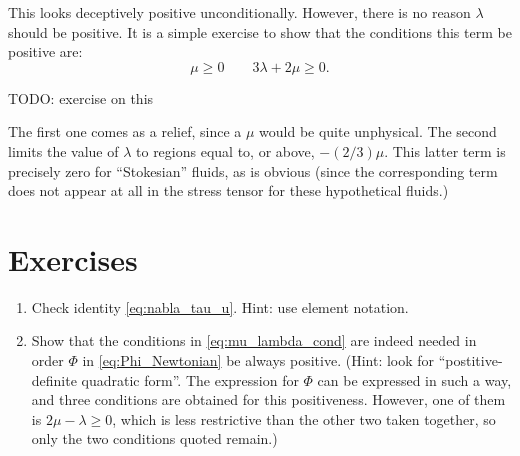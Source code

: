 This looks deceptively positive unconditionally. However, there is no
reason $\lambda$ should be positive. It is a simple exercise to show
that the conditions this term be positive are:
\begin{equation}
  \mu \ge 0 \qquad 3\lambda + 2\mu \ge 0 .\label{eq:mu_lambda_cond}
\end{equation}

TODO: exercise on this

The first one comes as a relief, since a $\mu$ would be quite
unphysical. The second limits the value of $\lambda$ to regions equal
to, or above, $ - (2/3) \mu$. This latter term is precisely zero for
``Stokesian'' fluids, as is obvious (since the corresponding term does
not appear at all in the stress tensor for these hypothetical fluids.)

\section{Exercises}

\begin{enumerate}
\item Check identity \ref{eq:nabla_tau_u}. Hint: use element notation.
\item Show that the conditions in \ref{eq:mu_lambda_cond} are indeed
  needed in order $\Phi$ in \ref{eq:Phi_Newtonian} be always
  positive. (Hint: look for ``postitive-definite quadratic form''. The
  expression for $\Phi$ can be expressed in such a way, and three
  conditions are obtained for this positiveness. However, one of them
  is $2\mu-\lambda \ge 0$, which is less restrictive than the other
  two taken together, so only the two conditions quoted remain.)
\end{enumerate}

